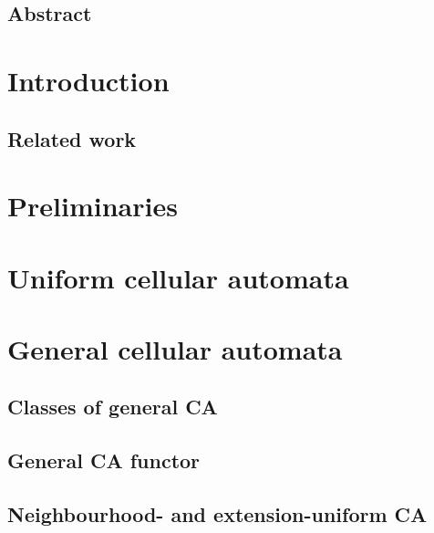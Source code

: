 \documentclass[10pt, letterpaper]{article}
\title{}
\author{Lulof Pirée}
\date{\today}
\begin{document}
    \thispagestyle{plain} 
    \begin{minipage}[t][0.3\pdfpageheight][b]{0.8\textwidth}
        \subsection*{Abstract}
        {\large }
    \end{minipage}
    \newpage
    \setlength{\parindent}{0.0in}
    \setlength{\parskip}{0.05in}

    \tableofcontents{}

    \section{Introduction}
    \label{sec:intro}
    
    \subsection{Related work}
    \label{sec:related_work}
    

    \section{Preliminaries}
    \label{sec:prelim}
    

    \section{Uniform cellular automata}
    \label{sec:uniform}
    

    \section{General cellular automata}
    \label{sec:disuniform}
    
    \subsection{Classes of general CA}
    \label{sec:disunif_intro}
    
    \subsection{General CA functor}
    
    \subsection{Neighbourhood- and extension-uniform CA}
    \label{sec:neigbhd_similarity}
    
\end{document}
